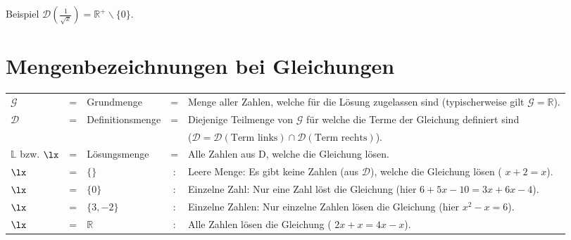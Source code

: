 Beispiel $\mathcal{D}(\frac{1}{\sqrt{x}}) = \mathbb{R}^{+}\backslash \{0\}$.

\section{Mengenbezeichnungen bei Gleichungen}
\begin{tabular}{lclcp{10cm}}
  $\mathcal{G}$ &=& Grundmenge &=& Menge aller Zahlen, welche für die Lösung zugelassen sind (typischerweise gilt $\mathcal{G}=\mathbb{R}$). \\
  $\mathcal{D}$ &=& Definitionsmenge &=& Diejenige Teilmenge von
                                        $\mathcal{G}$ für welche die Terme der Gleichung definiert sind\\
   & & & &  ($\mathcal{D}=\mathcal{D}(\textrm{Term links})\cap\mathcal{D}(\textrm{Term rechts})$).\\

   $\mathbb{L}$ bzw. $\lx$ &=& Lösungsmenge &=& Alle Zahlen
  aus D, welche die Gleichung lösen.\\

  $\lx$ &=&$\{\}$ &:& Leere Menge: Es gibt keine Zahlen
  (aus $\mathcal{D}$), welche die Gleichung lösen (\zB{} $x+2=x$).\\

  $\lx$ &=&$\{0\}$ &:& Einzelne Zahl: Nur eine Zahl löst die
  Gleichung (hier \zB{} $6+5x-10=3x+6x-4$).\\

 $\lx$ &=&$\{3, -2\}$ &:& Einzelne Zahlen: Nur einzelne
  Zahlen lösen die Gleichung (hier \zB{} $x^2-x=6$).\\

  $\lx$ &=& $\mathbb{R}$ &:& Alle Zahlen lösen die Gleichung
  (\zB{} $2x+x=4x-x$).\\

\end{tabular}



